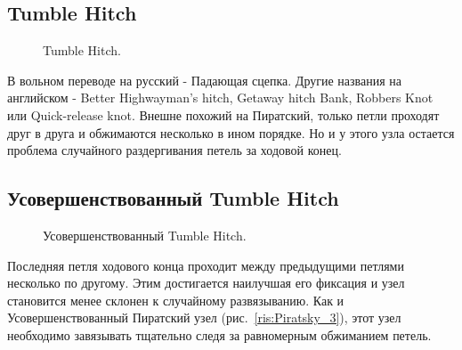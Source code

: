 \subsection{Tumble Hitch}

\begin{figure}[H]\centering
	\subfloat[Завязывание]{\label{ris:Tumble_Hitch_1}
	\tcbox[enhanced jigsaw,colframe=black,opacityframe=0.5,opacityback=0.5,height=6cm]
		{\centering
			}
		}
\hfil
	\subfloat[Завязывание]{\label{ris:Tumble_Hitch_2}
	\tcbox[enhanced jigsaw,colframe=black,opacityframe=0.5,opacityback=0.5,height=6cm]
		{\centering
			}
		}
\hfil
	\subfloat[Результат]{\label{ris:Tumble_Hitch_3}
	\tcbox[enhanced jigsaw,colframe=black,opacityframe=0.5,opacityback=0.5]
		{\centering
			}
		}
	\caption{Tumble Hitch.}\label{ris:Tumble_Hitch}
\end{figure}

В вольном переводе на русский - Падающая сцепка. Другие названия на английском - Better Highwayman's hitch, Getaway hitch Bank, Robbers Knot или Quick-release knot. Внешне похожий на Пиратский, только петли проходят друг в друга и обжимаются несколько в ином порядке. Но и у этого узла остается проблема случайного раздергивания петель за ходовой конец.

\subsection{Усовершенствованный Tumble Hitch}

\begin{figure}[H]\centering
	\begin{minipage}{1\linewidth}
		\begin{center}
			\tcbox[enhanced jigsaw,colframe=black,opacityframe=0.5,opacityback=0.5]
			{\centering{}}
		\end{center}
	\end{minipage}
\caption{Усовершенствованный Tumble Hitch.}
\label{ris:Tumble_Hitch_var}
\end{figure}

Последняя петля ходового конца проходит между предыдущими петлями несколько по другому. Этим достигается наилучшая его фиксация и узел становится менее склонен к случайному развязыванию. Как и Усовершенствованный Пиратский узел (рис.~\ref{ris:Piratsky_3}), этот узел необходимо завязывать тщательно следя за равномерным обжиманием петель.

